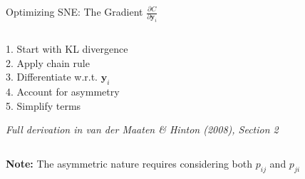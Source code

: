 \documentclass{beamer}
\begin{document}
\begin{frame}{Optimizing SNE: The Gradient $\frac{\partial C}{\partial \mathbf{y}_i}$}
\begin{columns}[T]
\begin{column}{0.48\textwidth}
\footnotesize
1. Start with KL divergence\\
2. Apply chain rule\\
3. Differentiate w.r.t. $\mathbf{y}_i$\\
4. Account for asymmetry\\
5. Simplify terms

\vspace{0.2cm}
\textit{Full derivation in van der Maaten \& Hinton (2008), Section 2}
\end{column}
\end{columns}

\vspace{0.3cm}
\begin{center}
\colorbox{highlight!20}{
\begin{minipage}{0.85\textwidth}
\centering
\footnotesize\textbf{Note:} The asymmetric nature requires considering both $p_{ij}$ and $p_{ji}$
\end{minipage}
}
\end{center}
\end{frame}
\end{document}

